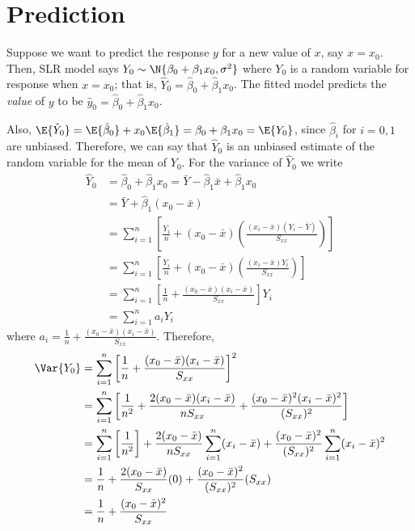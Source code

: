 \section{Prediction}
Suppose we want to predict the response $ y $
for a new value of $ x $, say $ x=x_0 $. Then,
SLR model says
$ Y_0 \sim \N{\beta_0+\beta_1 x_0,\sigma^2} $
where $ Y_0 $ is a random variable for response when $ x=x_0 $;
that is, $ \hat{Y}_0=\hat{\beta}_0+\hat{\beta}_1x_0 $.
The fitted model predicts the \emph{value} of $ y $
to be $ \hat{y}_0=\hat{\beta}_0+\hat{\beta}_1x_0 $.

Also, $\E{\hat{Y}_0}=\E{\hat{\beta}_0}+x_0\E{\hat{\beta}_1}=
    \beta_0+\beta_1x_0=\E{Y_0} $,
since $ \hat{\beta}_i $ for $ i=0,1 $ are unbiased.
Therefore, we can say that $ \hat{Y}_0 $ is an unbiased estimate
of the random variable for the mean of $ Y_0 $. For the variance
of $ \hat{Y}_0 $ we write
\begin{align*}
    \hat{Y}_0
     & =
    \hat{\beta}_0+\hat{\beta}_1x_0=\bar{Y}-\hat{\beta}_1\bar{x}+
    \hat{\beta}_1x_0                                                                         \\
     & =\bar{Y}+\hat{\beta}_1(x_0-\bar{x})                                                   \\
     & =\sum_{i=1}^{n} \left[ \frac{Y_i}{n} +(x_0-\bar{x})
    \left( \frac{(x_i-\bar{x})(Y_i-\bar{Y})}{S_{xx}} \right)  \right]                        \\
     & =\sum_{i=1}^{n} \left[ \frac{Y_i}{n} +(x_0-\bar{x})
    \left( \frac{(x_i-\bar{x})Y_i}{S_{xx}} \right)  \right]                                  \\
     & =\sum_{i=1}^{n} \left[ \frac{1}{n} +\frac{(x_0-\bar{x})(x_i-\bar{x})}{S_{xx}} \right]
    Y_i                                                                                      \\
     & =\sum_{i=1}^{n} a_i Y_i
\end{align*}
where $ \displaystyle  a_i=\frac{1}{n} +\frac{(x_0-\bar{x})(x_i-\bar{x})}{S_{xx}} $.
Therefore,
\begin{align*}
    \Var{Y_0}
     & =\sum_{i=1}^{n} \left[ \frac{1}{n} +
    \frac{(x_0-\bar{x})(x_i-\bar{x})}{S_{xx}} \right]^2                \\
     & = \sum_{i=1}^{n} \left[ \frac{1}{n^2}+
        \frac{2(x_0-\bar{x})(x_i-\bar{x})}{nS_{xx}}+
    \frac{(x_0-\bar{x})^2(x_i-\bar{x})^2}{(S_{xx})^2}  \right]         \\
     & =\sum_{i=1}^{n} \left[ \frac{1}{n^2}  \right]+
    \frac{2(x_0-\bar{x})}{n S_{xx}}\sum_{i=1}^{n} (x_i-\bar{x})
    +\frac{(x_0-\bar{x})^2}{(S_{xx})^2} \sum_{i=1}^{n} (x_i-\bar{x})^2 \\
     & =\frac{1}{n} +\frac{2(x_0-\bar{x})}{S_{xx}}(0)+
    \frac{(x_0-\bar{x})^2}{(S_{xx})^2}(S_{xx})                         \\
     & =\frac{1}{n}+\frac{(x_0-\bar{x})^2}{S_{xx}}
\end{align*}
